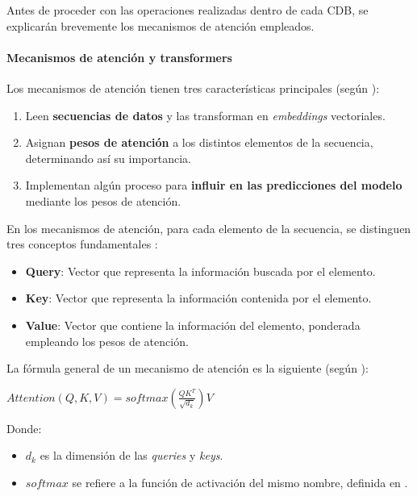 \documentclass[a4paper]{article}
\begin{document}
Antes de proceder con las operaciones realizadas dentro de cada CDB, se explicarán brevemente los mecanismos de atención empleados.

\paragraph{Mecanismos de atención y transformers}

Los mecanismos de atención \cite{Attention} tienen tres características principales (según \cite{IBMAttention}):

\begin{enumerate}
  \item{Leen \textbf{secuencias de datos} y las transforman en \textit{embeddings} vectoriales.}
  \item{Asignan \textbf{pesos de atención} a los distintos elementos de la secuencia, determinando así su importancia.}
  \item{Implementan algún proceso para \textbf{influir en las predicciones del modelo} mediante los pesos de atención.}
\end{enumerate}

En los mecanismos de atención, para cada elemento de la secuencia, se distinguen tres conceptos fundamentales \cite{IBMAttention}:

\begin{itemize}
  \item{\textbf{Query}: Vector que representa la información buscada por el elemento.}
  \item{\textbf{Key}: Vector que representa la información contenida por el elemento.}
  \item{\textbf{Value}: Vector que contiene la información del elemento, ponderada empleando los pesos de atención.}
\end{itemize}

La fórmula general de un mecanismo de atención es la siguiente (según \cite{Attention}):

\centerline{$Attention(Q, K, V) = softmax(\frac{QK^T}{\sqrt{d_k}})V$}

Donde:

\begin{itemize}
  \item{$d_k$ es la dimensión de las \textit{queries} y \textit{keys}.}
  \item{$softmax$ se refiere a la función de activación del mismo nombre, definida en \cite{Softmax}.}
\end{itemize}
\end{document}
